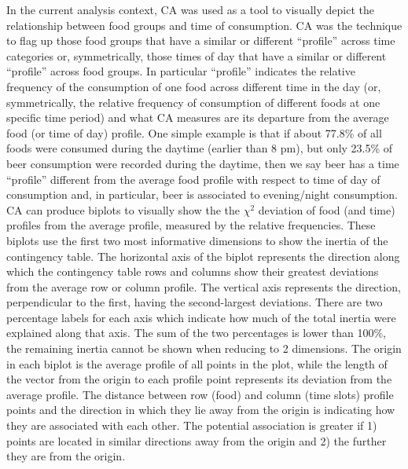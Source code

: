 \documentclass[utf8]{frontiersSCNS}
\begin{document}
In the current analysis context, CA was used as a tool to visually
depict the relationship between food groups and time of consumption. CA
was the technique to flag up those food groups that have a similar or
different ``profile'' across time categories or, symmetrically, those
times of day that have a similar or different ``profile'' across food
groups. In particular ``profile'' indicates the relative frequency of
the consumption of one food across different time in the day (or,
symmetrically, the relative frequency of consumption of different foods
at one specific time period) and what CA measures are its departure from
the average food (or time of day) profile. One simple example is that if
about 77.8\% of all foods were consumed during the daytime (earlier than
8 pm), but only 23.5\% of beer consumption were recorded during the
daytime, then we say beer has a time ``profile'' different from the
average food profile with respect to time of day of consumption and, in
particular, beer is associated to evening/night consumption. CA can
produce biplots to visually show the the \(\chi^2\) deviation of food
(and time) profiles from the average profile, measured by the relative
frequencies. These biplots use the first two most informative dimensions
to show the inertia of the contingency table. The horizontal axis of the
biplot represents the direction along which the contingency table rows
and columns show their greatest deviations from the average row or
column profile. The vertical axis represents the direction,
perpendicular to the first, having the second-largest deviations. There
are two percentage labels for each axis which indicate how much of the
total inertia were explained along that axis. The sum of the two
percentages is lower than 100\%, the remaining inertia cannot be shown
when reducing to 2 dimensions. The origin in each biplot is the average
profile of all points in the plot, while the length of the vector from
the origin to each profile point represents its deviation from the
average profile. The distance between row (food) and column (time slots)
profile points and the direction in which they lie away from the origin
is indicating how they are associated with each other. The potential
association is greater if 1) points are located in similar directions
away from the origin and 2) the further they are from the origin.
\end{document}
